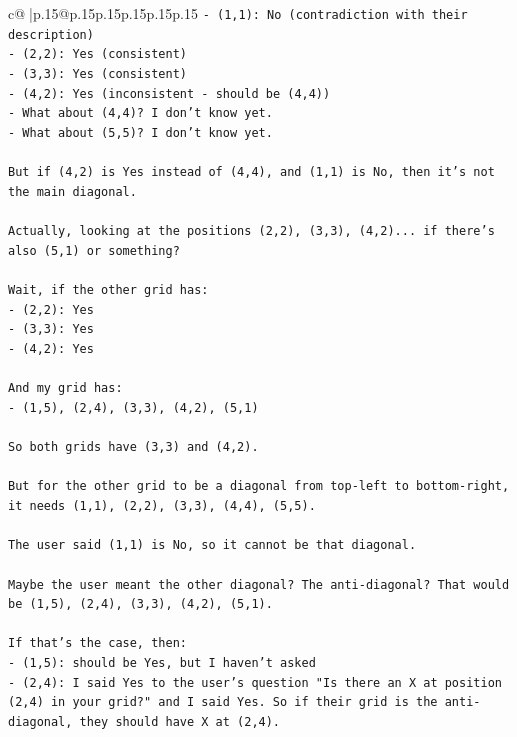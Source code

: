 \documentclass{article}
\begin{document}
{\begin{supertabular}{c@{$\;$}|p{.15\linewidth}@{}p{.15\linewidth}p{.15\linewidth}p{.15\linewidth}p{.15\linewidth}p{.15\linewidth}}
{{{\texttt{{-} (1,1): No (contradiction with their description)} \\
\texttt{{-} (2,2): Yes (consistent)} \\
\texttt{{-} (3,3): Yes (consistent)} \\
\texttt{{-} (4,2): Yes (inconsistent {-} should be (4,4))} \\
\texttt{{-} What about (4,4)? I don't know yet.} \\
\texttt{{-} What about (5,5)? I don't know yet.} \\
\\ 
\texttt{But if (4,2) is Yes instead of (4,4), and (1,1) is No, then it's not the main diagonal.} \\
\\ 
\texttt{Actually, looking at the positions (2,2), (3,3), (4,2)... if there's also (5,1) or something?} \\
\\ 
\texttt{Wait, if the other grid has:} \\
\texttt{{-} (2,2): Yes} \\
\texttt{{-} (3,3): Yes  } \\
\texttt{{-} (4,2): Yes} \\
\\ 
\texttt{And my grid has:} \\
\texttt{{-} (1,5), (2,4), (3,3), (4,2), (5,1)} \\
\\ 
\texttt{So both grids have (3,3) and (4,2).} \\
\\ 
\texttt{But for the other grid to be a diagonal from top{-}left to bottom{-}right, it needs (1,1), (2,2), (3,3), (4,4), (5,5).} \\
\\ 
\texttt{The user said (1,1) is No, so it cannot be that diagonal.} \\
\\ 
\texttt{Maybe the user meant the other diagonal? The anti{-}diagonal? That would be (1,5), (2,4), (3,3), (4,2), (5,1).} \\
\\ 
\texttt{If that's the case, then:} \\
\texttt{{-} (1,5): should be Yes, but I haven't asked} \\
\texttt{{-} (2,4): I said Yes to the user's question "Is there an X at position (2,4) in your grid?" and I said Yes. So if their grid is the anti{-}diagonal, they should have X at (2,4).} \\
}}}
\end{supertabular}}
\end{document}

